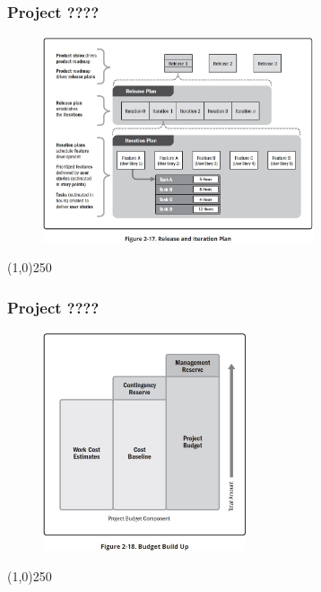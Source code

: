 \begin{frame}
\frametitle{Project ????}
 \begin{figure}
    \centering
        \includegraphics[width = 8cm]{../images/guide/Fig2-17.jpg}
    \label{guidefig:2-17}
 \end{figure}
\end{frame}
\begin{center}\line(1,0){250}\end{center}

\begin{frame}
\frametitle{Project ????}
 \begin{figure}
    \centering
        \includegraphics[width = 6cm]{../images/guide/Fig2-18.jpg}
    \label{guidefig:2-18}
 \end{figure}
\end{frame}
\begin{center}\line(1,0){250}\end{center}



